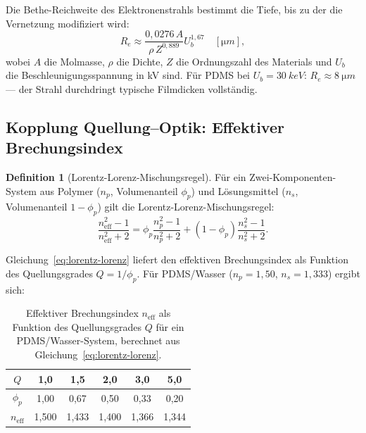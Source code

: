 ﻿\documentclass[a4paper,12pt]{article}
\theoremstyle{definition}
\newtheorem{definition}{Definition}[section]
\newcommand{\neff}{n_\mathrm{eff}}
\begin{document}
	Die Bethe-Reichweite des Elektronenstrahls bestimmt die Tiefe, bis zu der
	die Vernetzung modifiziert wird:
	\begin{equation}
		R_e \approx \frac{0{,}0276\, A}{\rho\, Z^{0{,}889}} U_b^{1{,}67} \quad [\si{\micro m}],
		\label{eq:bethe-reichweite}
	\end{equation}
	wobei $A$ die Molmasse, $\rho$ die Dichte, $Z$ die Ordnungszahl des Materials
	und $U_b$ die Beschleunigungsspannung in kV sind.
	Für PDMS bei $U_b = \SI{30}{keV}$: $R_e \approx \SI{8}{\micro m}$ ---
	der Strahl durchdringt typische Filmdicken vollständig.
	
	\subsection{Kopplung Quellung--Optik: Effektiver Brechungsindex}
	\label{ssec:kopplungsgleichung}
	
	\begin{definition}[Lorentz-Lorenz-Mischungsregel]
		\label{def:lorentz-lorenz}
		Für ein Zwei-Komponenten-System aus Polymer ($n_p$, Volumenanteil $\phi_p$)
		und Lösungsmittel ($n_s$, Volumenanteil $1-\phi_p$) gilt die
		Lorentz-Lorenz-Mischungsregel:
		\begin{equation}
			\frac{\neff^2 - 1}{\neff^2 + 2} = \phi_p \frac{n_p^2-1}{n_p^2+2}
			+ (1-\phi_p)\frac{n_s^2-1}{n_s^2+2}.
			\label{eq:lorentz-lorenz}
		\end{equation}
	\end{definition}
	
	Gleichung~\eqref{eq:lorentz-lorenz} liefert den effektiven Brechungsindex
	als Funktion des Quellungsgrades $Q = 1/\phi_p$. Für PDMS/Wasser
	($n_p = 1{,}50$, $n_s = 1{,}333$) ergibt sich:
	
	\begin{table}[htb]
		\centering
		\caption{Effektiver Brechungsindex $\neff$ als Funktion des Quellungsgrades
			$Q$ für ein PDMS/Wasser-System, berechnet aus Gleichung~\eqref{eq:lorentz-lorenz}.}
		\label{tab:neff}
		\begin{tabular}{cccccc}
			\toprule
			$Q$ & 1{,}0 & 1{,}5 & 2{,}0 & 3{,}0 & 5{,}0 \\
			\midrule
			$\phi_p$ & 1{,}00 & 0{,}67 & 0{,}50 & 0{,}33 & 0{,}20 \\
			$\neff$ & 1{,}500 & 1{,}433 & 1{,}400 & 1{,}366 & 1{,}344 \\
			\bottomrule
		\end{tabular}
	\end{table}
	
\end{document}
